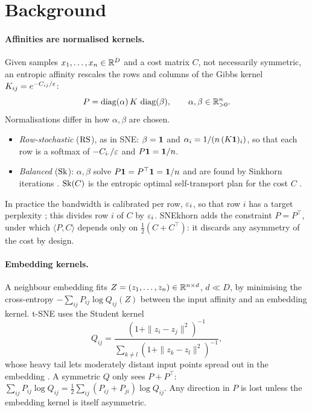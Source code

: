 \section{Background}
\label{sec:background}

\paragraph{Affinities are normalised kernels.}
Given samples $x_1,\dots,x_n\in\mathbb{R}^D$ and a cost matrix $C$, not
necessarily symmetric, an entropic affinity rescales the rows and columns
of the Gibbs kernel $K_{ij}=e^{-C_{ij}/\varepsilon}$:
\begin{equation}
  P=\operatorname{diag}(\alpha)\,K\,\operatorname{diag}(\beta),\qquad \alpha,\beta\in\mathbb{R}^n_{>0} .
  \label{eq:scaling}
\end{equation}
Normalisations differ in how $\alpha,\beta$ are chosen.
\begin{itemize}
  \item \emph{Row-stochastic} ($\operatorname{RS}$), as in SNE: $\beta=\mathbf{1}$ and
    $\alpha_i=1/(n\,(K\mathbf{1})_i)$, so that each row is a softmax of
    $-C_{i\cdot}/\varepsilon$ and $P\mathbf{1}=\mathbf{1}/n$.
  \item \emph{Balanced} ($\operatorname{Sk}$): $\alpha,\beta$ solve
    $P\mathbf{1}=P^\top\mathbf{1}=\mathbf{1}/n$ and are found by Sinkhorn iterations
    \citep{sinkhorn1967concerning,cuturi2013sinkhorn}. $\operatorname{Sk}(C)$ is the
    entropic optimal self-transport plan for the cost $C$
    \citep{peyre2019computational}.
\end{itemize}
In practice the bandwidth is calibrated per row, $\varepsilon_i$, so that row
$i$ has a target perplexity
\citep{hinton2002sne,vladymyrov2013entropic}; this divides row $i$ of
$C$ by $\varepsilon_i$. SNEkhorn \citep{vanassel2023snekhorn} adds the
constraint $P=P^\top$, under which $\langle P,C\rangle$ depends only on
$\tfrac12(C+C^\top)$: it discards any asymmetry of the cost by design.

\paragraph{Embedding kernels.}
A neighbour embedding fits $Z=(z_1,\dots,z_n)\in\mathbb{R}^{n\times d}$, $d\ll D$,
by minimising the cross-entropy $-\sum_{ij}P_{ij}\log Q_{ij}(Z)$ between
the input affinity and an embedding kernel. t-SNE uses the Student
kernel
\begin{equation}
  Q_{ij}=\frac{(1+\|z_i-z_j\|^2)^{-1}}{\sum_{k\neq l}(1+\|z_k-z_l\|^2)^{-1}},
  \label{eq:student}
\end{equation}
whose heavy tail lets moderately distant input points spread out in the
embedding \citep{vandermaaten2008tsne}. A symmetric $Q$ only sees
$P+P^\top$: $\sum_{ij}P_{ij}\log Q_{ij}=\tfrac12\sum_{ij}(P_{ij}+P_{ji})\log Q_{ij}$.
Any direction in $P$ is lost unless the embedding kernel is itself
asymmetric.

